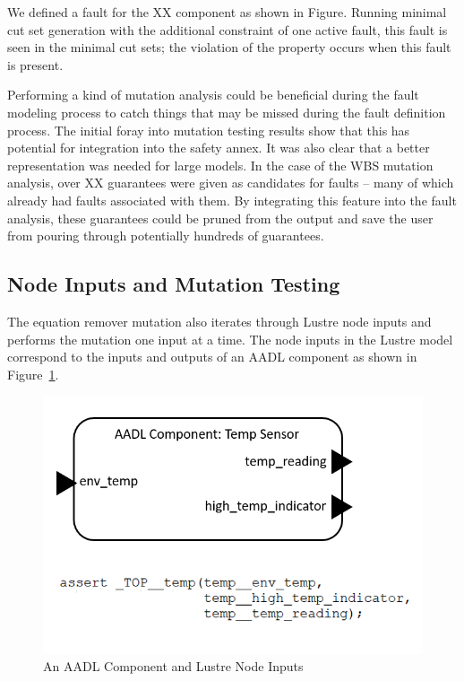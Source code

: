 We defined a fault for the XX component as shown in Figure. Running minimal cut set generation with the additional constraint of one active fault, this fault is seen in the minimal cut sets; the violation of the property occurs when this fault is present. 

Performing a kind of mutation analysis could be beneficial during the fault modeling process to catch things that may be missed during the fault definition process. The initial foray into mutation testing results show that this has potential for integration into the safety annex. It was also clear that a better representation was needed for large models. In the case of the WBS mutation analysis, over XX guarantees were given as candidates for faults -- many of which already had faults associated with them. By integrating this feature into the fault analysis, these guarantees could be pruned from the output and save the user from pouring through potentially hundreds of guarantees. 

\subsection{Node Inputs and Mutation Testing}
The equation remover mutation also iterates through Lustre node inputs and performs the mutation one input at a time. The node inputs in the Lustre model correspond to the inputs and outputs of an AADL component as shown in Figure~\ref{fig:nodeInputsLustre}. 

\begin{figure}[h]
	\begin{center}
		\includegraphics[scale=0.8]{images/nodeInputsLustre.PNG}
	\end{center}
	\caption{An AADL Component and Lustre Node Inputs}
	\label{fig:nodeInputsLustre}
\end{figure}

